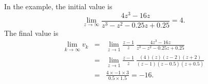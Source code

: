 In the example, the initial value is \[\lim_{z\rightarrow
  \infty}\frac{4z^3-16z}{z^3-z^2-0.25z+0.25} = 4.\] The final value is
\begin{eqnarray*}
  \lim_{k\rightarrow \infty}v_k &=& \lim_{z\rightarrow
      1}\frac{z-1}{z}\ \frac{4z^3-16z}{z^3-z^2-0.25z+0.25}\\
 &=& \lim_{z\rightarrow
      1}\frac{z-1}{z}\ \frac{(4)(z)(z-2)(z+2)}{(z-1)(z-0.5)(z+0.5)}\\
&=& \frac{4\times -1 \times 3}{0.5\times 1.5} = -16.
\end{eqnarray*}

\endinput

